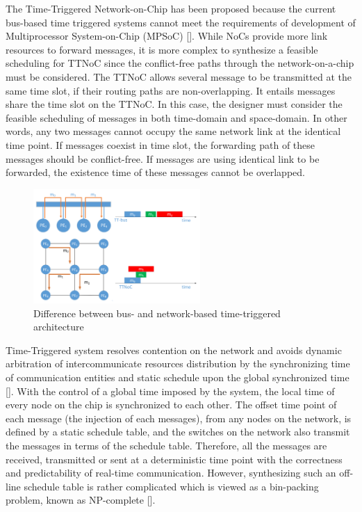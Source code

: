 \documentclass[conference]{IEEEtran}
\begin{document}
The Time-Triggered Network-on-Chip has been proposed because the current bus-based time triggered systems cannot meet the requirements of development of Multiprocessor System-on-Chip (MPSoC) []. While NoCs provide more link resources to forward messages, it is more complex to synthesize a feasible scheduling for TTNoC since the conflict-free paths through the network-on-a-chip must be considered. The TTNoC allows several message to be transmitted at the same time slot, if their routing paths are non-overlapping. It entails messages share the time slot on the TTNoC. In this case, the designer must consider the feasible scheduling of messages in both time-domain and space-domain. In other words, any two messages cannot occupy the same network link at the identical time point. If messages coexist in time slot, the forwarding path of these messages should be conflict-free. If messages are using identical link to be forwarded, the existence time of these messages cannot be overlapped.

\begin{figure}[!t]
	\centering
	\includegraphics[width=2.5in]{picture/difference.pdf}
	\caption{Difference between bus- and network-based time-triggered architecture}
	\label{architecture difference fig}
\end{figure}

Time-Triggered system resolves contention on the network and avoids dynamic arbitration of intercommunicate resources distribution by the synchronizing time of communication entities and static schedule upon the global synchronized time []. With the control of a global time imposed by the system, the local time of every node on the chip is synchronized to each other. The offset time point of each message (the injection of each messages), from any nodes on the network, is defined by a static schedule table, and the switches on the network also transmit the messages in terms of the schedule table. Therefore, all the messages are received, transmitted or sent at a deterministic time point with the correctness and predictability of real-time communication. However, synthesizing such an off-line schedule table is rather complicated which is viewed as a bin-packing problem, known as NP-complete [].
\end{document}
